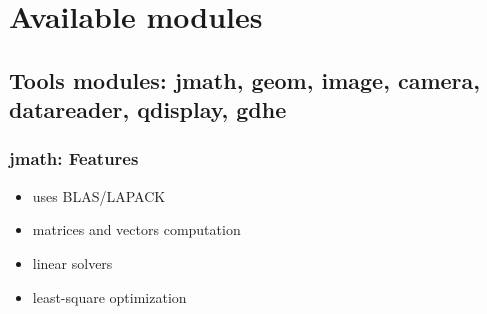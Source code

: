 \documentclass[compress]{beamer}
\begin{document}

\section{Available modules}


\subsection{Tools modules: jmath, geom, image, camera, datareader, qdisplay, gdhe}
\begin{frame}
  \frametitle{jmath: Features}
  \begin{itemize}
   \item uses BLAS/LAPACK
   \item matrices and vectors computation
   \item linear solvers
   \item least-square optimization
  \end{itemize}
\end{frame}

\end{document}

